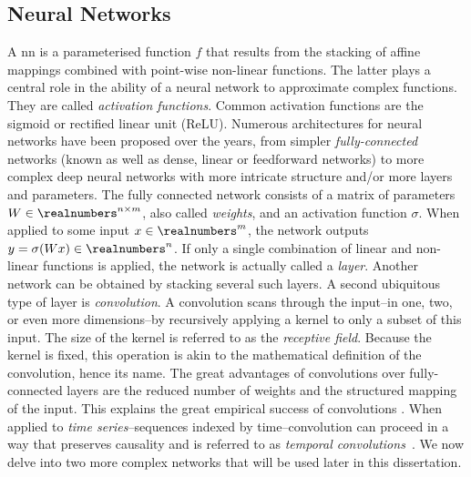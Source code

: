 \subsection{Neural Networks}
A \gls{nn} is a parameterised function $f$ that results from the stacking of affine mappings combined with point-wise non-linear functions. 
The latter plays a central role in the ability of a neural network to approximate complex functions. They are called \emph{activation functions}. 
Common activation functions are the sigmoid or rectified linear unit (ReLU). 
Numerous architectures for neural networks have been proposed over the years, from simpler \emph{fully-connected} networks (known as well as dense, linear or feedforward networks) to more complex deep neural networks \cite{goodfellow2016deep} with more intricate structure and/or more layers and parameters.
The fully connected network consists of a matrix of parameters $W\in\realnumbers^{n\times m}$, also called \emph{weights}, and an activation function $\sigma$.
When applied to some input $x\in\realnumbers^m$, the network outputs $y=\sigma(Wx)\in\realnumbers^n$.
If only a single combination of linear and non-linear functions is applied, the network is actually called a \emph{layer}. 
Another network can be obtained by stacking several such layers. 
A second ubiquitous type of layer is \emph{convolution}. 
A convolution scans through the input--in one, two, or even more dimensions--by recursively applying a kernel to only a subset of this input. 
The size of the kernel is referred to as the \emph{receptive field}. 
Because the kernel is fixed, this operation is akin to the mathematical definition of the convolution, hence its name. 
The great advantages of convolutions over fully-connected layers are the reduced number of weights and the structured mapping of the input. 
This explains the great empirical success of convolutions \cite{krizhevsky2017imagenet}. 
When applied to \emph{time series}--sequences indexed by time--convolution can proceed in a way that preserves causality and is referred to as \emph{temporal convolutions}~\cite{oord2016wavenet, liotet2020deep}.
We now delve into two more complex networks that will be used later in this dissertation.


